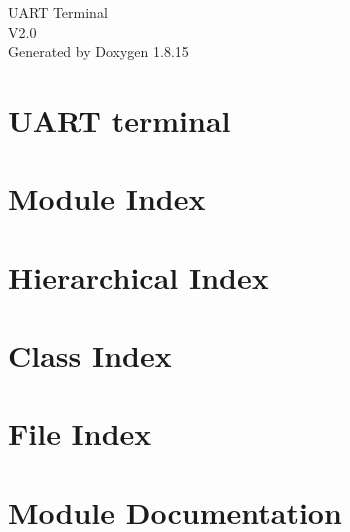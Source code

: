 \let\mypdfximage\pdfximage\def\pdfximage{\immediate\mypdfximage}\documentclass[twoside]{book}
\newcommand{\+}{\discretionary{\mbox{\scriptsize$\hookleftarrow$}}{}{}}
\newcommand{\clearemptydoublepage}{%
  \newpage{\pagestyle{empty}\cleardoublepage}%
}
\begin{document}
\begin{titlepage}
\vspace*{7cm}
\begin{center}%
{\Large U\+A\+RT Terminal \\[1ex]\large V2.\+0 }\\
\vspace*{1cm}
{\large Generated by Doxygen 1.8.15}\\
\end{center}
\end{titlepage}
\clearemptydoublepage
{}
\tableofcontents
\clearemptydoublepage
{}

\chapter{U\+A\+RT terminal}
\label{index}
\chapter{Module Index}

\chapter{Hierarchical Index}

\chapter{Class Index}

\chapter{File Index}

\chapter{Module Documentation}





























\end{document}
